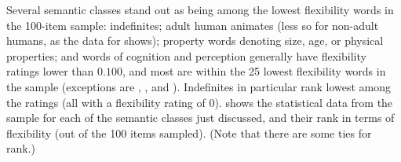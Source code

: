 Several semantic classes stand out as being among the lowest flexibility words in the 100-item  sample: indefinites; adult human animates (less so for non-adult humans, as the data for  shows); property words denoting size, age, or physical properties; and words of cognition and perception generally have flexibility ratings lower than $0.100$, and most are within the 25 lowest flexibility words in the sample (exceptions are , , and ). Indefinites in particular rank lowest among the ratings (all with a flexibility rating of $0$).  shows the statistical data from the sample for each of the semantic classes just discussed, and their rank in terms of flexibility (out of the 100 items sampled). (Note that there are some ties for rank.)

